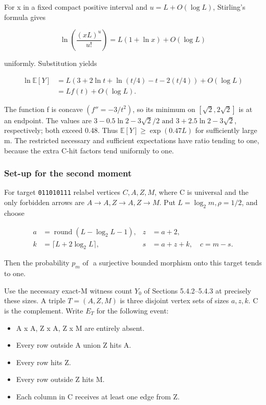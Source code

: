 \documentclass[11pt]{article}
\begin{document}
For x in a fixed compact positive interval and $u=L+O(\log  L)$, Stirling's formula gives

\[
\ln\left(\frac{(xL)^u}{u!}\right)=L(1+\ln x)+O(\log L)
\]

uniformly. Substitution yields

\[
\begin{aligned}
\ln\mathbb E[Y]&=L(3+2\ln t+\ln(t/4)-t-2(t/4))+O(\log L)\\
&=Lf(t)+O(\log L).
\end{aligned}
\]

The function f is concave $(f''=-3/t^{2})$, so its minimum on $[\sqrt{2},2\sqrt{2}]$ is at an endpoint. The values are $3-0.5 \ln  2-3 \sqrt{2}/2 \text{ and } 3+2.5 \ln  2-3 \sqrt{2}$, respectively; both exceed 0.48. Thus $\mathbb E[Y]\geq \exp (0.47 L)$ for sufficiently large m. The restricted necessary and sufficient expectations have ratio tending to one, because the extra C-hit factors tend uniformly to one.

\subsubsection{Set-up for the second moment}

For target \texttt{011010111} relabel vertices $C,A,Z,M$, where C is universal and the only forbidden arrows are $A\to A, Z\to A, Z\to M$. Put $L=\log _{2} m, \rho =1/2$, and choose

\[
\begin{aligned}
a&=\operatorname{round}(L-\log_2L-1),&z&=a+2,\\
k&=\lceil L+2\log_2L\rceil,&s&=a+z+k,\quad c=m-s.
\end{aligned}
\]

Then the probability $p_{m} \text{ of }$ a surjective bounded morphism onto this target tends to one.

Use the necessary exact-M witness count $Y_{0}$ of Sections 5.4.2--5.4.3 at precisely these sizes. A triple $T=(A,Z,M)$ is three disjoint vertex sets of sizes $a,z,k$. C is the complement. Write $E_{T}$ for the following event:

\begin{itemize}
\item A x A, Z x A, Z x M are entirely absent.
\item Every row outside A union Z hits A.
\item Every row hits Z.
\item Every row outside Z hits M.
\item Each column in C receives at least one edge from Z.
\end{itemize}
\end{document}
